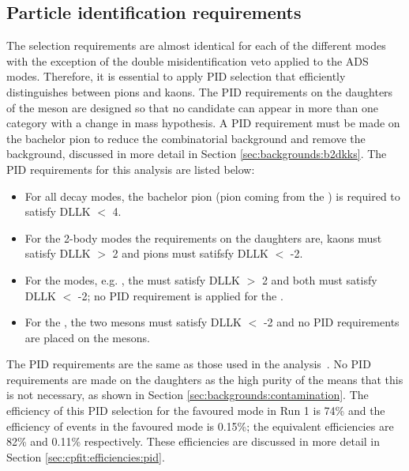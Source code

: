 \subsection{Particle identification requirements}
\label{sec:selection:pid}

The selection requirements are almost identical for each of the different \Dz modes with the exception of the double misidentification veto applied to the ADS modes. Therefore, it is essential to apply PID selection that efficiently distinguishes between pions and kaons. The PID requirements on the daughters of the \Dz meson are designed so that no  candidate can appear in more than one category with a change in mass hypothesis. A PID requirement must be made on the bachelor pion to reduce the combinatorial background and remove the \decay{\Bm}{\D\KS\Km} background, discussed in more detail in Section \ref{sec:backgrounds:b2dkks}. The PID requirements for this analysis are listed below:
\begin{itemize}
\item For all \Dz decay modes, the bachelor pion (pion coming from the \Kstarm) is required to satisfy DLLK $<$ 4.
\item For the 2-body \Dz modes the requirements on the \Dz daughters are, kaons must satisfy DLLK $>$ 2 and pions must satifsfy DLLK $<$ -2. 
\item For the  modes, e.g. \decay{\Dz}{\Km\pip\pim\pip}, the \Km must satisfy DLLK $>$ 2 and both \pip must satisfy DLLK $<$ -2; no PID requirement is applied for the \pim.
\item For the \decay{\Dz}{\pip\pim\pip\pim}, the two \pip mesons must satisfy DLLK $<$ -2 and no PID requirements are placed on the \pim mesons.
\end{itemize}

The PID requirements are the same as those used in the \decay{\Bp}{\D\Kp} analysis~\cite{LHCb-PAPER-2016-003}. No PID requirements are made on the \KS daughters as the high purity of the \KS means that this is not necessary, as shown in Section \ref{sec:backgrounds:contamination}. The efficiency of this PID selection for the \kpi favoured mode in Run 1 is 74\% and the efficiency of \pik events in the favoured mode is 0.15\%; the equivalent \runtwo efficiencies are 82\% and 0.11\% respectively. These efficiencies are discussed in more detail in Section \ref{sec:cpfit:efficiencies:pid}. 

